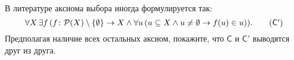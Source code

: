 В литературе аксиома выбора иногда формулируется так:
\begin{equation*}
    \forall X\, \exists f\, (f\colon \mathcal{P} (X) \setminus \{ \emptyset\} \rightarrow X \wedge
    \forall u\, (u \subseteq X \wedge u \ne \emptyset \rightarrow f(u) \in u)).
    \tag{$\mathsf{C}'$}
\end{equation*}
Предполагая наличие всех остальных аксиом, покажите, что $\mathsf{C}$ и $\mathsf{C}'$ выводятся друг из
друга.

